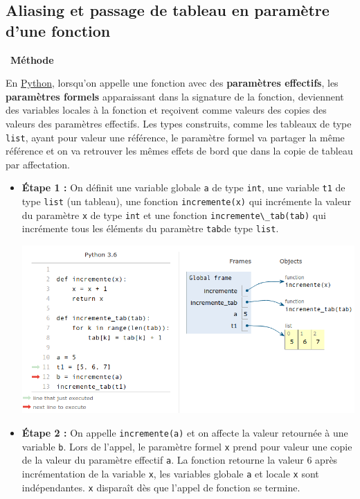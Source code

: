 \documentclass[
  11pt,
]{article}
\newcommand{\passthrough}[1]{#1}
\newenvironment{methode}[1]
{\par \medskip    \noindent  
 \begin {bclogo}[arrondi =0.1,logo=\bcoutil, marge=4,noborder = true] {~\textbf{Méthode}   {\itshape #1} }  \par}
{
\end{bclogo}
 \par \bigskip }
\begin{document}
\hypertarget{aliasing-et-passage-de-tableau-en-paramuxe8tre-dune-fonction}{%
\subsection{Aliasing et passage de tableau en paramètre d'une
fonction}\label{aliasing-et-passage-de-tableau-en-paramuxe8tre-dune-fonction}}

\begin{methode}{}

En
\href{https://docs.python.org/3/tutorial/datastructures.html}{Python},
lorsqu'on appelle une fonction avec des \textbf{paramètres effectifs},
les \textbf{paramètres formels} apparaissant dans la signature de la
fonction, deviennent des variables locales à la fonction et reçoivent
comme valeurs des copies des valeurs des paramètres effectifs. Les types
construits, comme les tableaux de type \passthrough{\lstinline!list!},
ayant pour valeur une référence, le paramètre formel va partager la même
référence et on va retrouver les mêmes effets de bord que dans la copie
de tableau par affectation.

\begin{itemize}
\item
  \textbf{Étape 1 :} On définit une variable globale
  \passthrough{\lstinline!a!} de type \passthrough{\lstinline!int!}, une
  variable \passthrough{\lstinline!t1!} de type
  \passthrough{\lstinline!list!} (un tableau), une fonction
  \passthrough{\lstinline!incremente(x)!} qui incrémente la valeur du
  paramètre \passthrough{\lstinline!x!} de type
  \passthrough{\lstinline!int!} et une fonction
  \passthrough{\lstinline!incremente\_tab(tab)!} qui incrémente tous les
  éléments du paramètre \passthrough{\lstinline!tab!}de type
  \passthrough{\lstinline!list!}.

  \includegraphics{images/aliasing-fonction1.png}\\
\item
  \textbf{Étape 2 :} On appelle \passthrough{\lstinline!incremente(a)!}
  et on affecte la valeur retournée à une variable
  \passthrough{\lstinline!b!}. Lors de l'appel, le paramètre formel
  \passthrough{\lstinline!x!} prend pour valeur une copie de la valeur
  du paramètre effectif \passthrough{\lstinline!a!}. La fonction
  retourne la valeur 6 après incrémentation de la variable
  \passthrough{\lstinline!x!}, les variables globale
  \passthrough{\lstinline!a!} et locale \passthrough{\lstinline!x!} sont
  indépendantes. \passthrough{\lstinline!x!} disparaît dès que l'appel
  de fonction se termine.


\end{itemize}
\end{methode}
\end{document}
